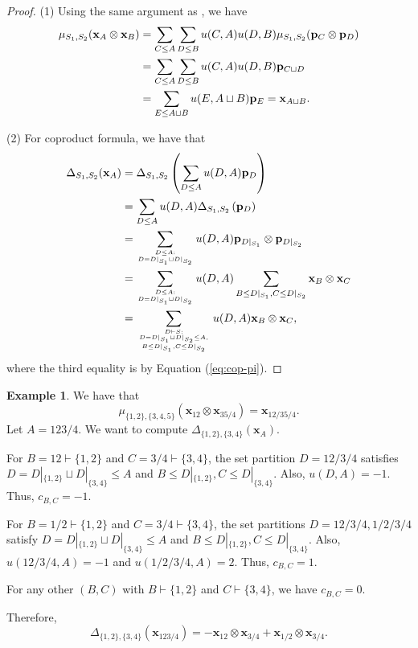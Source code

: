 \documentclass[12pt]{amsart}  %
\theoremstyle{definition}
\newtheorem{example}[theorem]{Example}
\theoremstyle{remark}
\numberwithin{equation}{section}
\newcommand{\phm}{\mathbf{p}}                %
\newcommand{\xhm}{\mathbf{x}}
\newcommand{\mymu}{{u}}
\newcommand\svw[1]{{\color{black}{#1}}}
\begin{document}
\begin{proof} (1) Using the same argument as 
\cite[Lemma 4.2]{BHRZ}, we have  
\begin{equation*}
\begin{split} 
\mu_{S_1,S_2}(\xhm_A\otimes \xhm_B)&=\sum_{C\leq A} \sum_{D\leq B} \mymu(C,A)\mymu(D,B)\mu_{S_1,S_2}(\svw{\phm_C}\otimes \phm_D)
\\
&=\sum_{C\leq A} \sum_{D\leq B} \mymu(C,A)\mymu(D,B)\svw{\phm_{C\sqcup D}}\\
&=\sum_{E\leq \svw{A\sqcup B}} {\mymu}(E,A\sqcup B) \phm_E=\xhm_{A\sqcup B}.
\end{split} 
\end{equation*} 


(2) For \svw{the} coproduct formula, 
we have that 
\begin{equation*}
\begin{split}
\Delta_{S_1,S_2}(\xhm_A)&=\Delta_{S_1,S_2}\left(\sum_{D\leq A} \mymu(D,A) \phm_D\right)
\\
& =\sum_{D\leq A} \mymu(D,A) \Delta_{S_1,S_2}\left(\phm_D\right)\\
&=\sum_{D\leq A:\atop{D=D|_{S_1}\sqcup D|_{S_2}} } \mymu(D,A)\phm_{D|_{S_1}} \otimes \phm_{D|_{S_2}} \\&=\sum_{D\leq A:\atop {D=D|_{S_1}\sqcup D|_{S_2}} } \mymu(D,A)\sum_{{B\leq D|_{S_1}, C\leq D|_{S_2}} }\xhm_{B} \otimes \xhm_{C} 
\\
&=\sum_{D\vdash S: \atop{D=D|_{S_1}\sqcup D|_{S_2}\leq A, \atop {B\leq D|_{S_1}, C\leq D|_{S_2}}}} \mymu(D,A)\xhm_{B} \otimes \xhm_{C},
\end{split} 
\end{equation*} 
where the third equality is by Equation (\ref{eq:cop-pi}).
\end{proof} 

\begin{example}
We have that 
$$\mu_{\{1,2\},\{3,4,5\}}(\xhm_{12} \otimes \xhm_{35/4})=\xhm_{12/35/4}.$$
Let $A=123/4$. We want to compute 
$\Delta_{\{1,2\},\{3,4\}}(\xhm_{A}).$ 

For $B=12\vdash \{1,2\}$ and $C=3/4\vdash \{3,4\}$, the set partition $D=12/3/4$ satisfies $D=D|_{\{1,2\}}\sqcup D|_{\{3,4\}}\leq A$ and $B\leq D|_{\{1,2\}}, C\leq D|_{\{3,4\}}$. Also, $\mymu(D,A)=-1$. Thus, $c_{B,C}=-1$. 



For $B=1/2\vdash \{1,2\}$ and $C=3/4\vdash \{3,4\}$, the set partitions $D=12/3/4, 1/2/3/4$ satisfy $D=D|_{\{1,2\}}\sqcup D|_{\{3,4\}}\leq A$ and $B\leq D|_{\{1,2\}}, C\leq D|_{\{3,4\}}$. Also, $\mymu(12/3/4,A)=-1$ and $\mymu(1/2/3/4,A)=2$. Thus, $c_{B,C}=1$.


For any other $(B,C)$ with $B\vdash \{1,2\}$ and $C\vdash \{3,4\}$, we have $c_{B,C}=0$. 

Therefore, 
$$\Delta_{\{1,2\},\{3,4\}}(\xhm_{123/4})=-\xhm_{12}\otimes \xhm_{3/4}+\xhm_{1/2}\otimes \xhm_{3/4}.$$
\end{example} 
\end{document}
